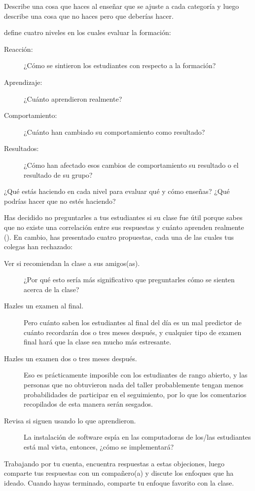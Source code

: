 Describe una cosa que haces al enseñar que se ajuste a cada categoría
y luego describe una cosa que no haces pero que deberías hacer.


\cite{Kirk1994} define cuatro niveles en los cuales evaluar la formación:

\begin{description}

\item[Reacción:]
  ¿Cómo se sintieron los estudiantes con respecto a la formación?

\item[Aprendizaje:]
  ¿Cuánto aprendieron realmente?

\item[Comportamiento:]
  ¿Cuánto han cambiado su comportamiento como resultado?

\item[Resultados:]
  ¿Cómo han afectado esos cambios de comportamiento su resultado
  o el resultado de su grupo?

\end{description}

¿Qué estás haciendo en cada nivel para evaluar qué y cómo enseñas?
¿Qué podrías hacer que no estés haciendo?


Has decidido no preguntarles a tus estudiantes si su clase fue útil
porque sabes que no existe una correlación entre sus respuestas
y cuánto aprenden realmente ().
En cambio,
has presentado cuatro propuestas,
cada una de las cuales tus colegas han rechazado:

\begin{description}

\item[Ver si recomiendan la clase a sus amigos(as).]
  ¿Por qué esto sería más significativo
  que preguntarles cómo se sienten acerca de la clase?
 
\item[Hazles un examen al final.]
  Pero cuánto saben los estudiantes al final del día
  es un mal predictor de cuánto recordarán dos o tres meses después,
  y cualquier tipo de examen final hará que la clase sea mucho más estresante.
 
\item[Hazles un examen dos o tres meses después.]
  Eso es prácticamente imposible con los estudiantes de rango abierto,
  y las personas que no obtuvieron nada del taller
  probablemente tengan menos probabilidades de participar en el seguimiento,
  por lo que los comentarios recopilados de esta manera serán sesgados.
 
\item[Revisa si siguen usando lo que aprendieron.]
  La instalación de software espía en las computadoras de los/las estudiantes está mal vista,
  entonces, ¿cómo se implementará?

\end{description}

Trabajando por tu cuenta,
encuentra respuestas a estas objeciones,
luego comparte tus respuestas con un compañero(a)
y discute los enfoques que ha ideado.
Cuando hayas terminado,
comparte tu enfoque favorito con la clase.
